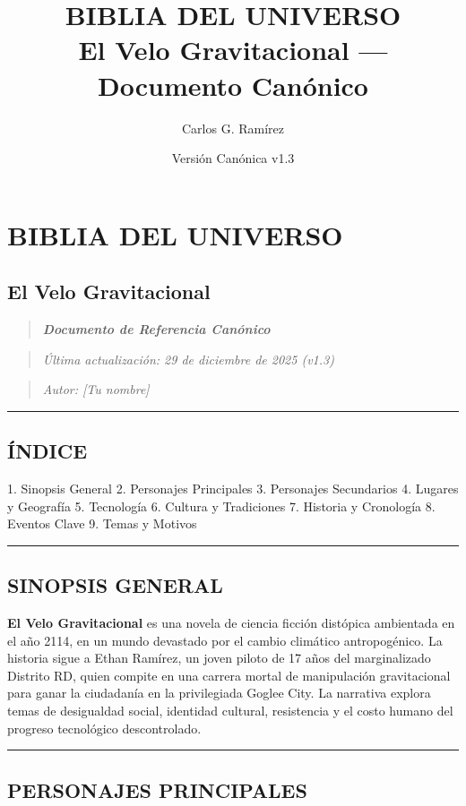 \documentclass[11pt,a4paper]{report}
\title{\textbf{BIBLIA DEL UNIVERSO}\\[0.5cm]\large El Velo Gravitacional --- Documento Canónico}
\author{Carlos G. Ramírez}
\date{Versión Canónica v1.3}
\begin{document}
\maketitle
\tableofcontents
\newpage
\chapter{BIBLIA DEL UNIVERSO}
\section{El Velo Gravitacional}

\begin{quote}\textit{\textbf{Documento de Referencia Canónico}}\end{quote}
\begin{quote}\textit{Última actualización: 29 de diciembre de 2025 (v1.3)}\end{quote}
\begin{quote}\textit{Autor: [Tu nombre]}\end{quote}

\bigskip\hrule\bigskip

\section{ÍNDICE}

1. Sinopsis General
2. Personajes Principales
3. Personajes Secundarios
4. Lugares y Geografía
5. Tecnología
6. Cultura y Tradiciones
7. Historia y Cronología
8. Eventos Clave
9. Temas y Motivos

\bigskip\hrule\bigskip

\section{SINOPSIS GENERAL}

\textbf{El Velo Gravitacional} es una novela de ciencia ficción distópica ambientada en el año 2114, en un mundo devastado por el cambio climático antropogénico. La historia sigue a Ethan Ramírez, un joven piloto de 17 años del marginalizado Distrito RD, quien compite en una carrera mortal de manipulación gravitacional para ganar la ciudadanía en la privilegiada Goglee City. La narrativa explora temas de desigualdad social, identidad cultural, resistencia y el costo humano del progreso tecnológico descontrolado.

\bigskip\hrule\bigskip

\section{PERSONAJES PRINCIPALES}
\end{document}
